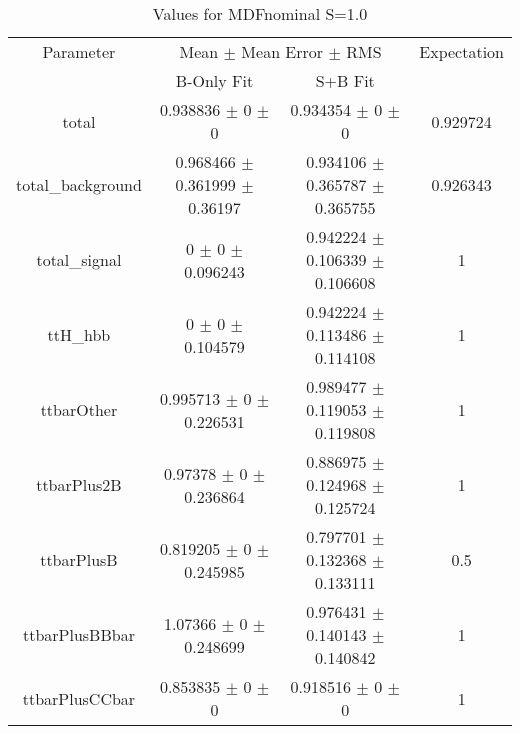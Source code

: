 \begin{table}
\centering
\caption{Values for MDFnominal S=1.0}
\begin{tabular}{cccc}
\toprule
Parameter & \multicolumn{2}{c}{Mean $\pm$ Mean Error $\pm$ RMS} & Expectation\\
 & B-Only Fit & S+B Fit & \\
\midrule
total & \num{0.938836} $\pm$ \num{0} $\pm$ \num{0} & \num{0.934354} $\pm$ \num{0} $\pm$ \num{0} & \num{0.929724}\\
total\_background & \num{0.968466} $\pm$ \num{0.361999} $\pm$ \num{0.36197} & \num{0.934106} $\pm$ \num{0.365787} $\pm$ \num{0.365755} & \num{0.926343}\\
total\_signal & \num{0} $\pm$ \num{0} $\pm$ \num{0.096243} & \num{0.942224} $\pm$ \num{0.106339} $\pm$ \num{0.106608} & \num{1}\\
ttH\_hbb & \num{0} $\pm$ \num{0} $\pm$ \num{0.104579} & \num{0.942224} $\pm$ \num{0.113486} $\pm$ \num{0.114108} & \num{1}\\
ttbarOther & \num{0.995713} $\pm$ \num{0} $\pm$ \num{0.226531} & \num{0.989477} $\pm$ \num{0.119053} $\pm$ \num{0.119808} & \num{1}\\
ttbarPlus2B & \num{0.97378} $\pm$ \num{0} $\pm$ \num{0.236864} & \num{0.886975} $\pm$ \num{0.124968} $\pm$ \num{0.125724} & \num{1}\\
ttbarPlusB & \num{0.819205} $\pm$ \num{0} $\pm$ \num{0.245985} & \num{0.797701} $\pm$ \num{0.132368} $\pm$ \num{0.133111} & \num{0.5}\\
ttbarPlusBBbar & \num{1.07366} $\pm$ \num{0} $\pm$ \num{0.248699} & \num{0.976431} $\pm$ \num{0.140143} $\pm$ \num{0.140842} & \num{1}\\
ttbarPlusCCbar & \num{0.853835} $\pm$ \num{0} $\pm$ \num{0} & \num{0.918516} $\pm$ \num{0} $\pm$ \num{0} & \num{1}\\
\bottomrule
\end{tabular}
\end{table}